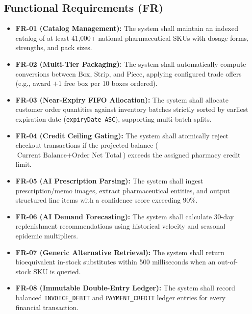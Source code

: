 \documentclass[12pt,a4paper]{article}
\begin{document}
\subsection{Functional Requirements (FR)}
\begin{itemize}
    \item \textbf{FR-01 (Catalog Management):} The system shall maintain an indexed catalog of at least 41,000+ national pharmaceutical SKUs with dosage forms, strengths, and pack sizes.
    \item \textbf{FR-02 (Multi-Tier Packaging):} The system shall automatically compute conversions between Box, Strip, and Piece, applying configured trade offers (e.g., award $+1$ free box per 10 boxes ordered).
    \item \textbf{FR-03 (Near-Expiry FIFO Allocation):} The system shall allocate customer order quantities against inventory batches strictly sorted by earliest expiration date (\texttt{expiryDate ASC}), supporting multi-batch splits.
    \item \textbf{FR-04 (Credit Ceiling Gating):} The system shall atomically reject checkout transactions if the projected balance ($\text{Current Balance} + \text{Order Net Total}$) exceeds the assigned pharmacy credit limit.
    \item \textbf{FR-05 (AI Prescription Parsing):} The system shall ingest prescription/memo images, extract pharmaceutical entities, and output structured line items with a confidence score exceeding $90\%$.
    \item \textbf{FR-06 (AI Demand Forecasting):} The system shall calculate 30-day replenishment recommendations using historical velocity and seasonal epidemic multipliers.
    \item \textbf{FR-07 (Generic Alternative Retrieval):} The system shall return bioequivalent in-stock substitutes within 500 milliseconds when an out-of-stock SKU is queried.
    \item \textbf{FR-08 (Immutable Double-Entry Ledger):} The system shall record balanced \texttt{INVOICE\_DEBIT} and \texttt{PAYMENT\_CREDIT} ledger entries for every financial transaction.
\end{itemize}
\end{document}
